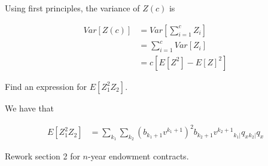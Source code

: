 \documentclass[12pt]{article}
\numberwithin{questioncounter}{section}
\begin{document}
\begin{solution}


Using first principles, the variance of $Z(c)$ is

\begin{align*}
Var[Z(c)] &= Var\left[\sum_{i=1}^{c} Z_{i} \right] \\
&= \sum_{i=1}^{c} Var[Z_{i}] \\
&= c [E[Z^2] - E[Z]^2]
\end{align*}

\end{solution}

\begin{question}
Find an expression for $E[Z_{1}^{2}Z_{2}]$.
\end{question}

\begin{solution}
We have that

\begin{align*}
E[Z_{1}^{2}Z_{2}] &= \sum_{k_{1}} \sum_{k_{2}} (b_{k_{1} + 1} v^{k_{1} + 1})^2 b_{k_{2} + 1} v^{k_{2} + 1} {}_{k_{1}|}q_{x} {}_{k_{2}|}q_{x}
\end{align*}

\end{solution}

\begin{question}
Rework section 2 for $n$-year endowment contracts.
\end{question}
\end{document}
